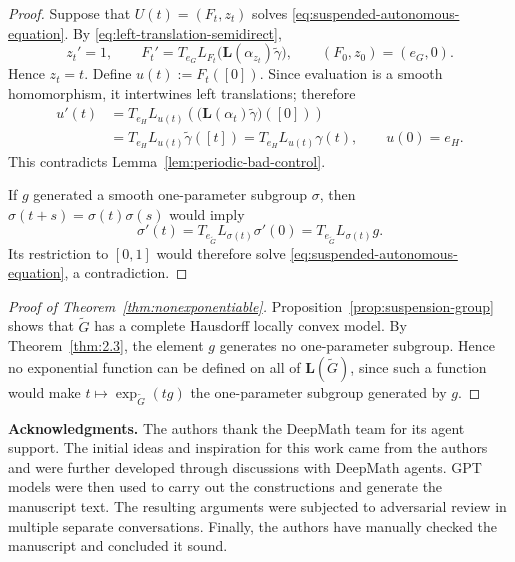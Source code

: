 \documentclass[11pt]{article}
\theoremstyle{remark}
\begin{document}
\begin{proof}
Suppose that $U(t)=(F_t,z_t)$ solves
\eqref{eq:suspended-autonomous-equation}.  By
\eqref{eq:left-translation-semidirect},
\[
  z_t'=1,
  \qquad
  F_t'=T_{e_G}L_{F_t}
  \bigl(\mathbf L(\alpha_{z_t})\widetilde\gamma\bigr),
  \qquad
  (F_0,z_0)=(e_G,0).
\]
Hence $z_t=t$.  Define $u(t):=F_t([0])$.  Since evaluation is a smooth
homomorphism, it intertwines left translations; therefore
\begin{align*}
  u'(t)
  &=T_{e_H}L_{u(t)}
    \left(\bigl(\mathbf L(\alpha_t)\widetilde\gamma\bigr)([0])\right)\\
  &=T_{e_H}L_{u(t)}\widetilde\gamma([t])
   =T_{e_H}L_{u(t)}\gamma(t),
  \qquad u(0)=e_H.
\end{align*}
This contradicts Lemma~\ref{lem:periodic-bad-control}.

If $g$ generated a smooth one-parameter subgroup $\sigma$, then
$\sigma(t+s)=\sigma(t)\sigma(s)$ would imply
\[
  \sigma'(t)=T_{e_{\widetilde G}}L_{\sigma(t)}\sigma'(0)
  =T_{e_{\widetilde G}}L_{\sigma(t)}g.
\]
Its restriction to $[0,1]$ would therefore solve
\eqref{eq:suspended-autonomous-equation}, a contradiction.
\end{proof}

\begin{proof}[Proof of Theorem~\ref{thm:nonexponentiable}]
Proposition~\ref{prop:suspension-group} shows that $\widetilde G$ has a
complete Hausdorff locally convex model.  By Theorem~\ref{thm:2.3}, the
element $g$ generates no one-parameter subgroup.  Hence no exponential
function can be defined on all of $\mathbf L(\widetilde G)$, since such a
function would make $t\mapsto\exp_{\widetilde G}(tg)$ the one-parameter
subgroup generated by $g$.
\end{proof}











\medskip
\noindent\textbf{Acknowledgments.}
The authors thank the DeepMath team for its agent support.  The initial ideas
and inspiration for this work came from the authors and were further
developed through discussions with DeepMath agents.  GPT models were
then used to carry out the constructions and generate the manuscript
text.  The resulting arguments were subjected to adversarial review in
multiple separate conversations.  
Finally, the authors have manually checked the manuscript and concluded it sound.
\end{document}
